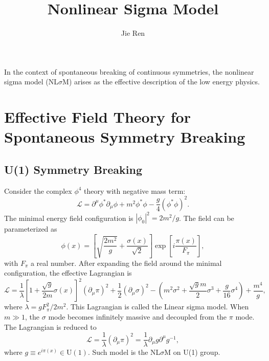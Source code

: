 \documentclass[aps,prb,superscriptaddress,nofootinbib]{revtex4}
\begin{document}
\title{Nonlinear Sigma Model}
\author{Jie Ren}


\maketitle

In the context of spontaneous breaking of continuous symmetries, the nonlinear sigma model (NL$\sigma$M) arises as the effective description of the low energy physics.

\tableofcontents

\section{Effective Field Theory for Spontaneous Symmetry Breaking}

\subsection{U(1) Symmetry Breaking}
Consider the complex $\phi^4$ theory with negative mass term:
\begin{equation}
	\mathcal L = \partial^\mu \phi^* \partial_\mu \phi + m^2\phi^* \phi - \frac{g}{4}(\phi^*\phi)^2.
\end{equation}
The minimal energy field configuration is $|\phi_0|^2 = 2m^2/g$.
The field can be parameterized as
\begin{equation}
	\phi(x)=\left[\sqrt{\frac{2 m^{2}}{g}}+\frac{\sigma(x)}{\sqrt{2}} \right] \exp\left[{i \frac{\pi(x)}{F_{\pi}}}\right],
\end{equation}
with $F_{\pi}$ a real number.
After expanding the field around the minimal configuration, the effective Lagrangian is
\begin{equation}
	\mathcal{L}= \frac{1}{\lambda} \left[1+\frac{\sqrt{g}}{2m} \sigma(x) \right]^{2} \left(\partial_{\mu} \pi\right)^{2} +\frac{1}{2}\left(\partial_{\mu} \sigma\right)^{2}
	-\left(m^{2} \sigma^{2}+\frac{\sqrt{g} m}{2} \sigma^{3}+\frac{g}{16} \sigma^{4}\right)+\frac{m^{4}}{g},
\end{equation}
where $\lambda = gF_\pi^2/2m^2$.
This Lagrangian is called the Linear sigma model.
When $m\gg 1$, the $\sigma$ mode becomes infinitely massive and decoupled from the $\pi$ mode.
The Lagrangian is reduced to
\begin{equation}
	\mathcal L = \frac{1}{\lambda} (\partial_\mu \pi)^2 = \frac{1}{\lambda}\partial_\mu g \partial^\mu g^{-1},
\end{equation}
where $g \equiv e^{i\pi(x)} \in \mathrm{U}(1)$. 
Such model is the NL$\sigma$M on U(1) group.
\end{document}
